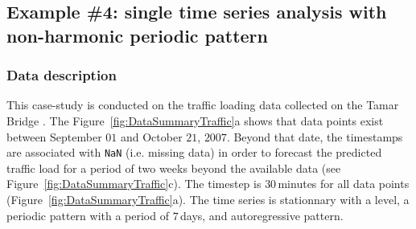 \subsection{Example \#4: single time series analysis with non-harmonic periodic pattern}
\label{S:Example_TRAFFIC}
\subsubsection{Data description}

This case-study is conducted on the traffic loading data collected on the Tamar Bridge \citep{Goulet2017BDLMEmprical,Nguyen2019KRBDLM}. 
The Figure~\ref{fig:DataSummaryTraffic}a shows that data points exist between  September $01$ and October $21$, $2007$. Beyond that date, the timestamps are associated with \lstinline[basicstyle = \mlttfamily \small ]!NaN! (i.e. missing data) in order to forecast the predicted traffic load for a period of two weeks beyond the available data (see Figure~\ref{fig:DataSummaryTraffic}c).  
The timestep is $30$\,minutes for all data points (Figure~\ref{fig:DataSummaryTraffic}a).
The time series is stationnary with a level, a periodic pattern with a period of $7$\,days, and autoregressive pattern.



